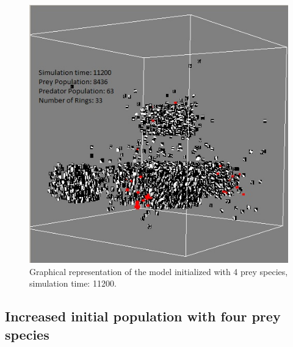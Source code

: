 \documentclass[letterpaper]{article}
\numberwithin{equation}{section}
\begin{document}
\begin{figure}[h]
	\centering
	\label{fig:screenshot-simTime11K-4Prey}
	\includegraphics[scale=0.55]{../tex/images/simTime11K-4Prey}
	\caption[Graphical representation of the model (simulation time: 11200)]{Graphical representation of the model initialized with 4 prey species, simulation time: 11200.}
\end{figure}

\subsection{Increased initial population with four prey species}
\end{document}
